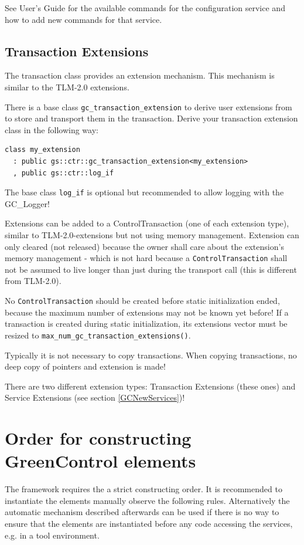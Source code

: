 See \GreenConfig User's Guide for the available commands for the configuration service and how to add new commands for that service.

\subsection{Transaction Extensions}
\label{sec:TransactionExtensions}

The transaction class provides an extension mechanism. This mechanism is similar to the TLM-2.0 extensions.

There is a base class \lstinline|gc_transaction_extension| to derive user extensions from to store and transport them in the transaction. Derive your transaction extension class in the following way:\newline
\begin{lstlisting}[language=TeX]
class my_extension 
  : public gs::ctr::gc_transaction_extension<my_extension> 
  , public gs::ctr::log_if
\end{lstlisting}
The base class \lstinline |log_if| is optional but recommended to allow logging with the GC\_Logger!

Extensions can be added to a ControlTransaction (one of each extension type), similar to TLM-2.0-extensions
but not using memory management.
Extension can only cleared (not released) because the owner shall care about the extension's
 memory management - which is not hard because a \lstinline|ControlTransaction| shall not be assumed to live longer than just during the transport call (this is different from TLM-2.0).

 No \lstinline|ControlTransaction| should be created before static initialization ended, because the 
 maximum number of extensions may not be known yet before! If a transaction is created
 during static initialization, its extensions vector must be resized to \lstinline|max_num_gc_transaction_extensions()|.
 
Typically it is not necessary to copy transactions. When copying transactions, no deep copy of pointers and extension is made!

 There are two different extension types: Transaction Extensions (these ones) and Service Extensions (see section \ref{GCNewServices})!

\section{Order for constructing GreenControl elements}
\label{OrderConstructionElements}
The \GreenControl framework requires the a strict constructing order. It is recommended to instantiate the elements manually observe the following rules. Alternatively the automatic mechanism described afterwards can be used if there is no way to ensure that the \GreenControl elements are instantiated before any code accessing the services, e.g. in a tool environment.


